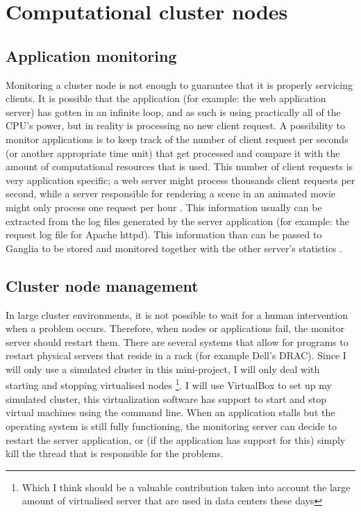 \documentclass[12pt]{report}
\begin{document}
\section{Computational cluster nodes}
\subsection{Application monitoring}
Monitoring a cluster node is not enough to guarantee that it is
properly servicing clients. It is possible that the application (for
example: the web application server) has gotten in an infinite loop,
and as such is using practically all of the CPU's power, but in reality is
processing no new client request.
A possibility to monitor applications is to keep track of the number of
client request per seconds (or another appropriate time unit) that get
processed and compare it with the amount of computational resources
that is used.
This number of client requests is very application specific; a web
server might process thousands client requests per second, while a
server responsible for rendering a scene in an animated movie might only process
one request per hour \cite{apm:2013}.
This information usually can be extracted from the log files generated
by the server application (for example: the request log file for
Apache httpd). This information than can be passed to Ganglia to be
stored and monitored together with the other server's statistics
\cite{ganglia:2013}.

\subsection{Cluster node management}
In large cluster environments, it is not possible to wait for
a human intervention when a problem occurs. Therefore, when nodes or
applications fail, the monitor server should restart them.
There are several systems that allow for programs to restart
physical servers that reside in a rack (for example Dell's DRAC).
Since I will only use a simulated cluster in this mini-project, I will
only deal with starting and stopping virtualised nodes \footnote{Which I think should
be a valuable contribution taken into account the large amount of
virtualised server that are used in data centers these days}.
I will use VirtualBox to set up my simulated cluster, this
virtualization software has support to start and stop virtual machines
using the command line.
When an application stalls but the operating system is still fully
functioning, the monitoring server can decide to restart the server application, or
(if the application has support for this) simply kill the thread that
is responsible for the problems.
\end{document}
